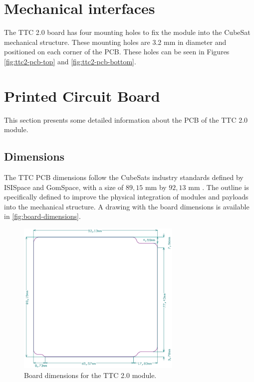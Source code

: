 \section{Mechanical interfaces}

The TTC 2.0 board has four mounting holes to fix the module into the CubeSat mechanical structure. These mounting holes are 3.2 mm in diameter and positioned on each corner of the PCB. These holes can be seen in Figures \ref{fig:ttc2-pcb-top} and \ref{fig:ttc2-pcb-bottom}.

\section{Printed Circuit Board}

This section presents some detailed information about the PCB of the TTC 2.0 module.

\subsection{Dimensions}

The TTC PCB dimensions follow the CubeSats industry standards defined by ISISpace and GomSpace, with a size of $89,15$ mm by $92,13$ mm \cite{nasa-handout}. The outline is specifically defined to improve the physical integration of modules and payloads into the mechanical structure. A drawing with the board dimensions is available in \autoref{fig:board-dimensions}.

\begin{figure}[!ht]
    \begin{center}
        \includegraphics[width=0.7\textwidth]{figures/board-dimensions.png}
        \caption{Board dimensions for the TTC 2.0 module.}
        \label{fig:board-dimensions}
    \end{center}
\end{figure}

